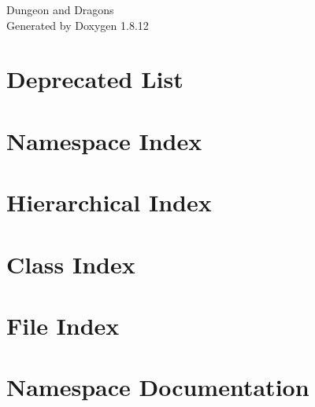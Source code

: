 \documentclass[twoside]{book}
\newcommand{\+}{\discretionary{\mbox{\scriptsize$\hookleftarrow$}}{}{}}
\newcommand{\clearemptydoublepage}{%
  \newpage{\pagestyle{empty}\cleardoublepage}%
}
\begin{document}
\hypersetup{pageanchor=false,
             bookmarksnumbered=true,
             pdfencoding=unicode
            }
\begin{titlepage}
\vspace*{7cm}
\begin{center}%
{\Large Dungeon and Dragons }\\
\vspace*{1cm}
{\large Generated by Doxygen 1.8.12}\\
\end{center}
\end{titlepage}
\clearemptydoublepage
{}
\tableofcontents
\clearemptydoublepage
{}
\hypersetup{pageanchor=true}

\chapter{Deprecated List}
\label{deprecated}
\hypertarget{deprecated}{}

\chapter{Namespace Index}

\chapter{Hierarchical Index}

\chapter{Class Index}

\chapter{File Index}

\chapter{Namespace Documentation}

\end{document}
